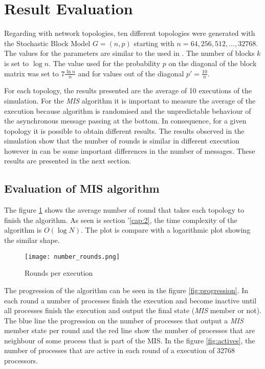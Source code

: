 \section{Result Evaluation}
\label{chap:6}
Regarding with network topologies, ten different topologies were generated with the Stochastic Block Model $G = (n,p)$ starting with $n=64,256,512,...,32768$. The values for the parameters are similar to the used in \cite{kothapalli2013analysis}.  The number of blocks $k$ is set to $\log n$. The value used for the probability $p$ on the diagonal of the block matrix was set to $7{\tfrac {\ln n}{n}}$  and for values out of the diagonal $p\prime = {\tfrac {10}{n}}$.

For each topology, the results presented are the average of 10 executions of the simulation. For the \textit{MIS} algorithm it is important to measure the average of the execution because algorithm is randomised and the unpredictable behaviour of the asynchronous message passing at the bottom. In consequence, for a given topology it is possible to obtain different results. The results observed in the simulation show that the number of rounds is similar in different execution however in can be some important differences in the number of messages. These results are presented in the next section.


\subsection{Evaluation of MIS algorithm}

The figure \ref{fig:rounds_execution} shows the average number of round that takes each topology to finish the algorithm. As seen is section '\ref{cap:2}, the time complexity of the algorithm is $O(\log N)$. The plot is compare with a logarithmic plot showing the similar shape.


\begin{figure}[ht]
\centering
\texttt{[image: number\_rounds.png]} 
\caption{Rounds per execution}
\label{fig:rounds_execution}
\end{figure}

The progression of the algorithm can be seen in the figure \ref{fig:progression}. In each round a number of processes finish the execution and become inactive until all processes finish the execution and output the final state (\textit{MIS} member or not). The blue line the progression on the number of processes that output a \textit{MIS} member state per round and the red line show the number of processes that are neighbour of some process that is part of the MIS.  In the figure \ref{fig:actives}, the number of processes that are active in each round of a execution of 32768 processors. 

